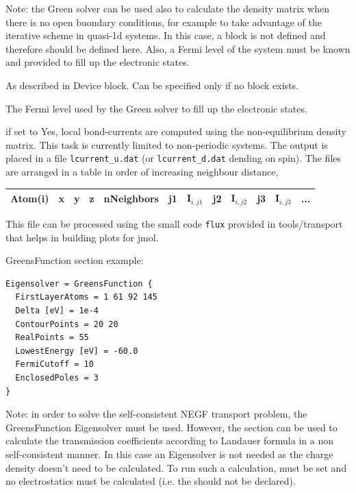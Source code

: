 \begin{description}
Note: the Green solver can be used also to calculate the density matrix when
there is no open buondary conditions, for example to take advantage of the
iterative scheme in quasi-1d systems. In this case, a  block is
not defined and therefore  should be defined here. Also, a
Fermi level of the system must be known and provided to fill up the electronic
states.
      
\item[\is{FirstLayerAtoms}] As described in Device block. Can be specified only
  if no  block exists.

\item[\is{FermiLevel}] The Fermi level used by the Green
  solver to fill up the electronic states.

\item[\is{LocalCurrents}] if set to Yes, local bond-currents are computed using
  the non-equilibrium density matrix.  This task is currently limited to
  non-periodic systems. The output is placed in a file \verb|lcurrent_u.dat| (or
  \verb|lcurrent_d.dat| dending on spin).  The files are arranged in a table in
  order of increasing neighbour distance,

\begin{tabular}{|c|c|c|c|c|c|c|c|c|c|c|c|}
  \hline
  Atom(i) & x & y & z &  nNeighbors &  j1 & I$_{i,j1}$ & j2 & I$_{i,j2}$ &  j3 & I$_{i,j3}$ & ...\\ 
  \hline
\end{tabular}

  This file can be processed using the small code \verb|flux| provided in
  tools/transport that helps in building plots for jmol.
\end{description}

GreensFunction section example:

\begin{verbatim}  
Eigensolver = GreensFunction {
  FirstLayerAtoms = 1 61 92 145
  Delta [eV] = 1e-4
  ContourPoints = 20 20
  RealPoints = 55
  LowestEnergy [eV] = -60.0
  FermiCutoff = 10
  EnclosedPoles = 3
}
\end{verbatim}


  Note: in order to solve the self-consistent NEGF transport problem, the
  GreensFunction Eigensolver must be used. However, the 
  section can be used to calculate the transmission coefficients according to
  Landauer formula in a non self-consistent manner. In this case an Eigensolver
  is not needed as the charge density doesn't need to be calculated.  To run
  such a calculation,  must be set and no
  electrostatics must be calculated (i.e. the 
  should not be declared).


